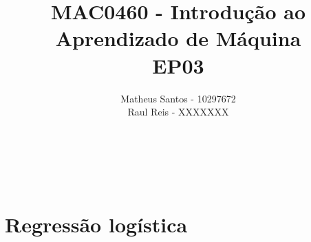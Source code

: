 \documentclass[12pt, a4paper]{article}
\title{MAC0460 - Introdução ao Aprendizado de Máquina \\ EP03}
\author{Matheus Santos - 10297672 \\
        Raul Reis - XXXXXXX}
\begin{document}
\makeatletter
\begin{center}
	{\Large\textbf \@title \\ }
	{\Large \@author \\ }
\end{center}

\vspace{1.1cm}

\section{Regressão logística}
\end{document}
